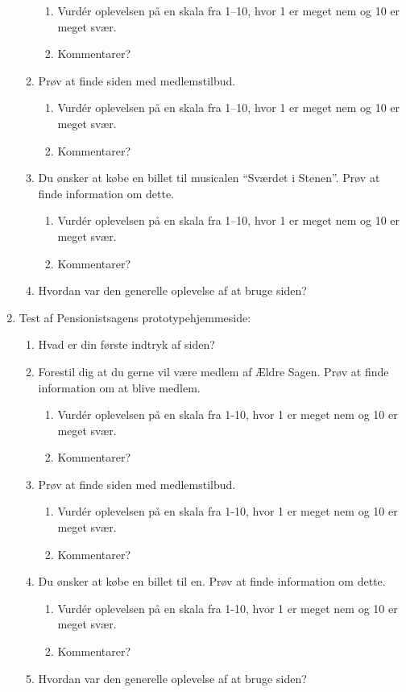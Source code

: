 \begin{enumerate}
\begin{enumerate}
\begin{enumerate}
            \item Vurdér oplevelsen på en skala fra 1--10, hvor 1 er meget nem og 10 er meget svær.
            \item Kommentarer?
        \end{enumerate}
        \item Prøv at finde siden med medlemstilbud.
        \begin{enumerate}
            \item Vurdér oplevelsen på en skala fra 1--10, hvor 1 er meget nem og 10 er meget svær.
            \item Kommentarer?
        \end{enumerate}
        \item Du ønsker at købe en billet til musicalen ``Sværdet i Stenen''. Prøv at finde information om dette.
        \begin{enumerate}
            \item Vurdér oplevelsen på en skala fra 1--10, hvor 1 er meget nem og 10 er meget svær.
            \item Kommentarer?
        \end{enumerate}
        \item Hvordan var den generelle oplevelse af at bruge siden?
    \end{enumerate}
    \item Test af Pensionistsagens prototypehjemmeside:
    \begin{enumerate}
        \item Hvad er din første indtryk af siden?
        \item Forestil dig at du gerne vil være medlem af Ældre Sagen. Prøv at finde information om at blive medlem.
        \begin{enumerate}
            \item Vurdér oplevelsen på en skala fra 1-10, hvor 1 er meget nem og 10 er meget svær.
            \item Kommentarer?
        \end{enumerate}
        \item Prøv at finde siden med medlemstilbud.
        \begin{enumerate}
            \item Vurdér oplevelsen på en skala fra 1-10, hvor 1 er meget nem og 10 er meget svær.
            \item Kommentarer?
        \end{enumerate}
        \item Du ønsker at købe en billet til en. Prøv at finde information om dette.
        \begin{enumerate}
            \item Vurdér oplevelsen på en skala fra 1-10, hvor 1 er meget nem og 10 er meget svær.
            \item Kommentarer?
        \end{enumerate}
        \item Hvordan var den generelle oplevelse af at bruge siden?
    \end{enumerate}
\end{enumerate}
